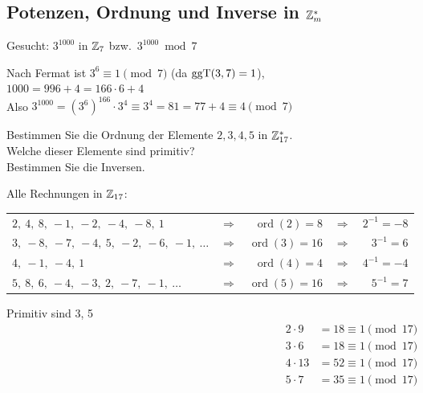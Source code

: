 \subsection{Potenzen, Ordnung und Inverse in $\mathbb{Z}_{m}^*$}

\begin{aufgabe}[Aufgabe 7]
Gesucht: $3^{1000}$ in $\mathbb{Z}_{7}$ bzw.\ $3^{1000} \bmod 7$
\end{aufgabe}

\begin{loesung}
Nach Fermat ist $3^6 \equiv 1 \pmod 7$ (da $\operatorname{ggT}(3, 7) = 1$),\\
$1000 = 996 + 4 = 166 \cdot 6 + 4$\\
Also $3^{1000} = (3^6)^{166} \cdot 3^4 \equiv 3^4 = 81 = 77 + 4 \equiv 4 \pmod 7$
\end{loesung}

\begin{aufgabe}[Aufgabe 8]
Bestimmen Sie die Ordnung der Elemente $2, 3, 4, 5$ in $\mathbb{Z}_{17}^*$.\\
Welche dieser Elemente sind primitiv?\\
Bestimmen Sie die Inversen.
\end{aufgabe}

\begin{loesung}
Alle Rechnungen in $\mathbb{Z}_{17}$:

\begin{tabular}{lcrcr}
$2,\ 4,\ 8,\ -1,\ -2,\ -4,\ -8,\ 1$ & $\Rightarrow$ & $\operatorname{ord}(2) = 8$ & $\Rightarrow$ & $2^{-1} = -8$\\
$3,\ -8,\ -7,\ -4,\ 5,\ -2,\ -6,\ -1,\ \ldots$ & $\Rightarrow$ & $\operatorname{ord}(3) = 16$ & $\Rightarrow$ & $3^{-1} = 6$\\
$4,\ -1,\ -4,\ 1$ & $\Rightarrow$ & $\operatorname{ord}(4) = 4$ & $\Rightarrow$ & $4^{-1} = -4$\\
$5,\ 8,\ 6,\ -4,\ -3,\ 2,\ -7,\ -1,\ \ldots$ & $\Rightarrow$ & $\operatorname{ord}(5) = 16$ & $\Rightarrow$ & $5^{-1} = 7$
\end{tabular}

\medskip
Primitiv sind 3, 5
\begin{align*}
2 \cdot 9 &= 18 \equiv 1 \pmod{17}\\
3 \cdot 6 &= 18 \equiv 1 \pmod{17}\\
4 \cdot 13 &= 52 \equiv 1 \pmod{17}\\
5 \cdot 7 &= 35 \equiv 1 \pmod{17}
\end{align*}
\end{loesung}

